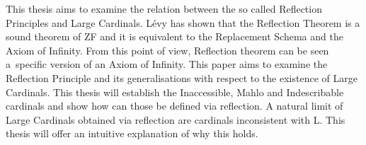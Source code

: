 \documentclass[12pt,a4paper]{article}
\begin{document}
\noindent This thesis aims to examine the relation between the so called Reflection Principles and Large Cardinals. Lévy has shown that the Reflection Theorem is a sound theorem of ZF and it is equivalent to the Replacement Schema and the Axiom of Infinity. From this point of view, Reflection theorem can be seen a~specific version of an Axiom of Infinity. This paper aims to examine the Reflection Principle and its generalisations with respect to the existence of Large Cardinals. This thesis will establish the Inaccessible, Mahlo and Indescribable cardinals and show how can those be defined via reflection. A natural limit of Large Cardinals obtained via reflection are cardinals inconsistent with L. This thesis will offer an intuitive explanation of why this holds.
\end{document}
